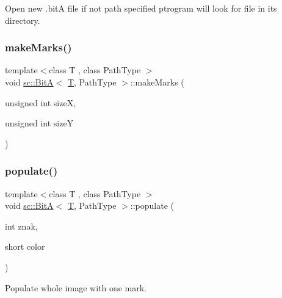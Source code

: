 Open new .bitA file if not path specified ptrogram will look for file in its directory. 

\mbox{\label{classsc_1_1_bit_a_a260a201ed0001e31536b483c06ec05e6}} 
\subsubsection{\texorpdfstring{makeMarks()}{makeMarks()}}
{\footnotesize\ttfamily template$<$class T , class Path\+Type $>$ \\
void \mbox{\hyperlink{classsc_1_1_bit_a}{sc\+::\+BitA}}$<$ \mbox{\hyperlink{_keyboard_event_8h_adf1f3edb9115acb0a1e04209b7a9937b}{T}}, Path\+Type $>$\+::make\+Marks (\begin{DoxyParamCaption}\item[{unsigned int}]{sizeX,  }\item[{unsigned int}]{sizeY }\end{DoxyParamCaption})\hspace{0.3cm}{\ttfamily [private]}}

\mbox{\label{classsc_1_1_bit_a_ab103e16a25786a4e145a0b469502176b}} 
\subsubsection{\texorpdfstring{populate()}{populate()}}
{\footnotesize\ttfamily template$<$class T , class Path\+Type $>$ \\
void \mbox{\hyperlink{classsc_1_1_bit_a}{sc\+::\+BitA}}$<$ \mbox{\hyperlink{_keyboard_event_8h_adf1f3edb9115acb0a1e04209b7a9937b}{T}}, Path\+Type $>$\+::populate (\begin{DoxyParamCaption}\item[{int}]{znak,  }\item[{short}]{color }\end{DoxyParamCaption})}



Populate whole image with one mark. 

\mbox{\label{classsc_1_1_bit_a_ad5e635670ca4015bbf720f35e5996c40}} 
